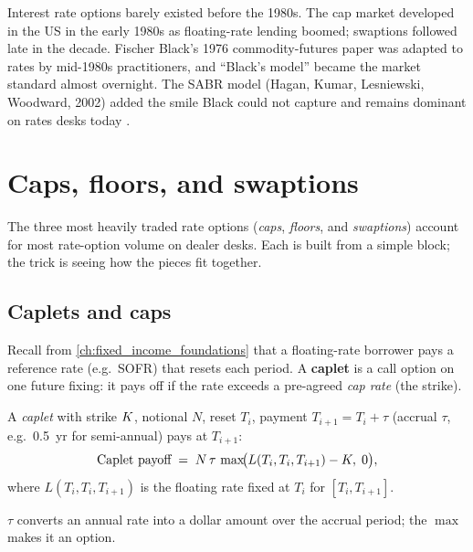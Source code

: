 \begin{historybox}
Interest rate options barely existed before the 1980s.  The cap
market developed in the US in the early 1980s as floating-rate lending
boomed; swaptions followed late in the decade.  Fischer Black's 1976
commodity-futures paper was adapted to rates by mid-1980s
practitioners, and ``Black's model'' became the market standard almost
overnight.  The SABR model (Hagan, Kumar, Lesniewski, Woodward, 2002)
added the smile Black could not capture and remains dominant on rates
desks today \citeHagan.
\end{historybox}


\section{Caps, floors, and swaptions}
\label{sec:caps_floors_swaptions}

The three most heavily traded rate options (\emph{caps},
\emph{floors}, and \emph{swaptions}) account for most rate-option
volume on dealer desks.  Each is built from a simple block; the trick
is seeing how the pieces fit together.

\subsection{Caplets and caps}

Recall from \cref{ch:fixed_income_foundations} that a floating-rate
borrower pays a reference rate (e.g.\ SOFR) that resets each period.
A \textbf{caplet} is a call option on one future fixing: it pays off
if the rate exceeds a pre-agreed \emph{cap rate} (the strike).

\begin{definition}[Caplet]
\label{def:caplet}
A \emph{caplet} with strike $K$, notional $N$, reset $T_i$,
payment $T_{i+1} = T_i + \tau$ (accrual $\tau$, e.g.\ 0.5~yr for
semi-annual) pays at $T_{i+1}$:
\begin{equation}
  \text{Caplet payoff} \;=\; N \,\tau \,\max\!\bigl(L(T_i, T_i, T_{i+1}) - K,\; 0\bigr),
  \label{eq:caplet_payoff}
\end{equation}
where $L(T_i, T_i, T_{i+1})$ is the floating rate fixed at $T_i$
for $[T_i, T_{i+1}]$.
\end{definition}

$\tau$ converts an annual rate into a dollar amount over the accrual
period; the $\max$ makes it an option.

